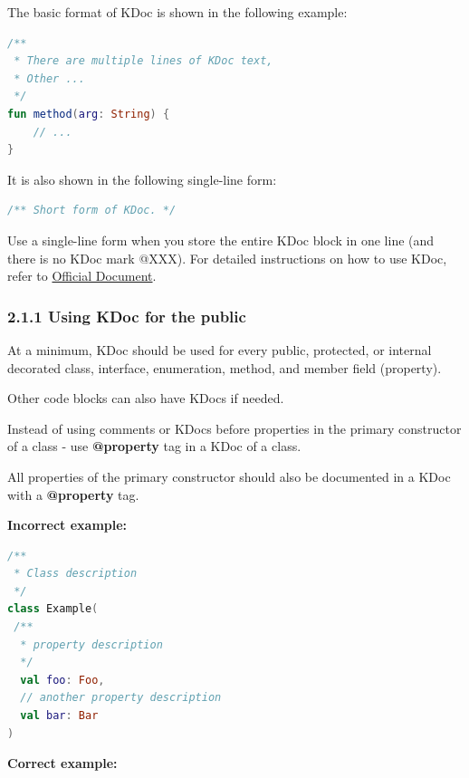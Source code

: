 The basic format of KDoc is shown in the following example:



\begin{lstlisting}[language=Kotlin]
 /**
 * There are multiple lines of KDoc text,
 * Other ...
 */
fun method(arg: String) {
    // ...
}
\end{lstlisting}


It is also shown in the following single-line form:



\begin{lstlisting}[language=Kotlin]
 /** Short form of KDoc. */
\end{lstlisting}
Use a single-line form when you store the entire KDoc block in one line (and there is no KDoc mark @XXX). For detailed instructions on how to use KDoc, refer to \href{https://docs.oracle.com/en/Kotlin/Kotlinse/11/tools/KDoc.html}{Official Document}.



\subsubsection*{\textbf{2.1.1 Using KDoc for the public}}
\leavevmode\newline

\label{sec:2.1.1}



At a minimum, KDoc should be used for every public, protected, or internal decorated class, interface, enumeration, method, and member field (property).

Other code blocks can also have KDocs if needed.

Instead of using comments or KDocs before properties in the primary constructor of a class - use \textbf{@property} tag in a KDoc of a class.

All properties of the primary constructor should also be documented in a KDoc with a \textbf{@property} tag.





\textbf{Incorrect example:}

\begin{lstlisting}[language=Kotlin]
/**
 * Class description
 */
class Example(
 /**
  * property description
  */
  val foo: Foo,
  // another property description
  val bar: Bar
)
\end{lstlisting}


\textbf{Correct example:}

